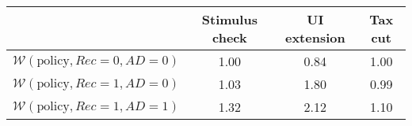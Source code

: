 \begin{tabular}{@{}lccc@{}} 
\toprule 
                          & Stimulus check      & UI extension    & Tax cut    \\  \midrule 
$\mathcal{W}(\text{policy}, Rec=0, AD=0)$ & 1.00  & 0.84  & 1.00     \\ 
$\mathcal{W}(\text{policy}, Rec=1, AD=0)$ & 1.03  & 1.80  & 0.99     \\ 
$\mathcal{W}(\text{policy}, Rec=1, AD=1)$ & 1.32  & 2.12  & 1.10     \\ \bottomrule 
\end{tabular}  
